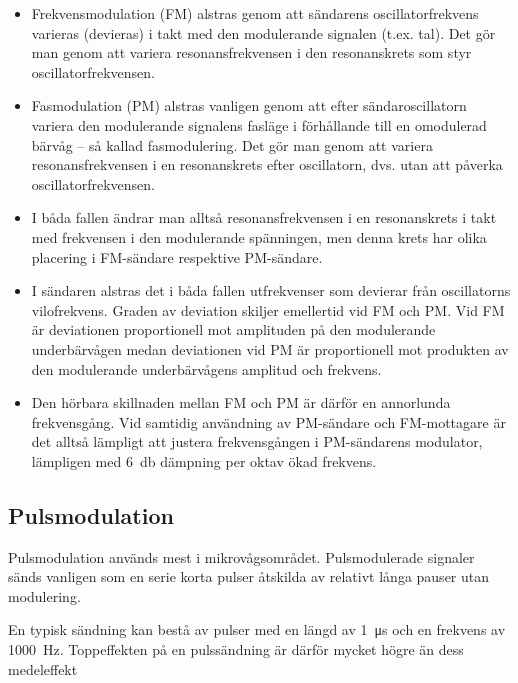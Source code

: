 \begin{itemize}
\item Frekvensmodulation (FM) alstras genom att sändarens oscillatorfrekvens
  varieras (devieras) i takt med den modulerande signalen (t.ex. tal).
  Det gör man genom att variera resonansfrekvensen i den resonanskrets som
  styr oscillatorfrekvensen.

\item Fasmodulation (PM) alstras vanligen genom att efter sändaroscillatorn
  variera den modulerande signalens fasläge i förhållande till en omodulerad
  bärvåg -- så kallad fasmodulering.
  Det gör man genom att variera resonansfrekvensen i en resonanskrets efter
  oscillatorn, dvs. utan att påverka oscillatorfrekvensen.

\item I båda fallen ändrar man alltså resonansfrekvensen i en resonanskrets i
  takt med frekvensen i den modulerande spänningen, men denna krets har
  olika placering i FM-sändare respektive PM-sändare.

\item I sändaren alstras det i båda fallen utfrekvenser som devierar från
  oscillatorns vilofrekvens.
  Graden av deviation skiljer emellertid vid FM och PM.
  Vid FM är deviationen proportionell mot amplituden på den modulerande
  underbärvågen medan deviationen vid PM är proportionell mot produkten av den
  modulerande underbärvågens amplitud och frekvens.

\item Den hörbara skillnaden mellan FM och PM är därför en annorlunda
  frekvensgång.
  Vid samtidig användning av PM-sändare och FM-mottagare är det alltså lämpligt
  att justera frekvensgången i PM-sändarens modulator, lämpligen
  med \SI{6}{\decibel} dämpning per oktav ökad frekvens.
\end{itemize}

\subsection{Pulsmodulation}

Pulsmodulation används mest i mikrovågsområdet.
Pulsmodulerade signaler sänds vanligen som en serie korta pulser åtskilda av
relativt långa pauser utan modulering.

En typisk sändning kan bestå av pulser med en längd av \SI{1}{\micro\second} och
en frekvens av \SI{1000}{\hertz}.
Toppeffekten på en pulssändning är därför mycket högre än dess medeleffekt

